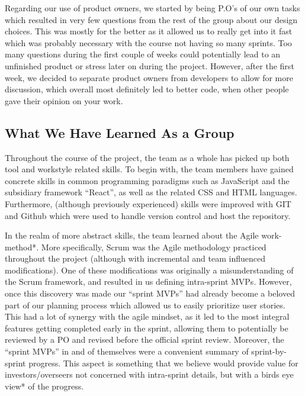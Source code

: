 Regarding our use of product owners, we started by being P.O’s of our own tasks which resulted in very few questions from the rest of the group about our design choices. This was mostly for the better as it allowed us to really get into it fast which was probably necessary with the course not having so many sprints. Too many questions during the first couple of weeks could potentially lead to an unfinished product or stress later on during the project. However, after the first week, we decided to separate product owners from developers to allow for more discussion, which overall most definitely led to better code, when other people gave their opinion on your work.


\subsection{What We Have Learned As a Group}
Throughout the course of the project, the team as a whole has picked up both tool and workstyle related skills. To begin with, the team members have gained concrete skills in common programming paradigms such as JavaScript\cite{JavaScript} and the subsidiary framework “React”\cite{React}, as well as the related CSS\cite{CSS} and HTML\cite{HTML} languages. Furthermore, (although previously experienced) skills were improved with GIT and Github which were used to handle version control and host the repository. 

In the realm of more abstract skills, the team learned about the Agile work-method*. More specifically, Scrum was the Agile methodology practiced throughout the project (although with incremental and team influenced modifications). One of these modifications was originally a misunderstanding of the Scrum framework, and resulted in us defining intra-sprint MVPs. However, once this discovery was made our “sprint MVPs” had already become a beloved part of our planning process which allowed us to easily prioritize user stories. This had a lot of synergy with the agile mindset, as it led to the most integral features getting completed early in the sprint, allowing them to potentially be reviewed by a PO and revised before the official sprint review. Moreover, the “sprint MVPs” in and of themselves were a convenient summary of sprint-by-sprint progress. This aspect is something that we believe would provide value for investors/overseers not concerned with intra-sprint details, but with a birds eye view* of the progress. 

